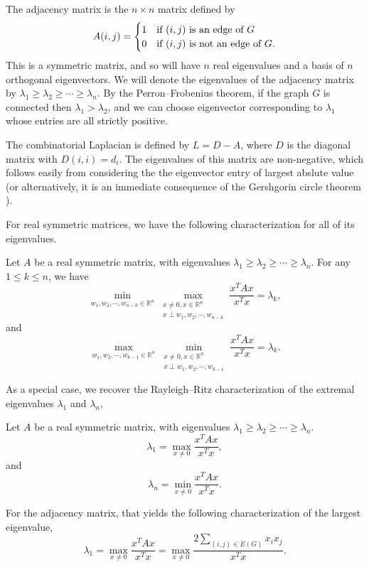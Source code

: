 The adjacency matrix is the $n \times n$ matrix defined by
\[
 A(i,j) =
  \begin{cases} 
      \hfill 1 \hfill & \text{if $(i,j)$ is an edge of $G$} \\
      \hfill 0 \hfill & \text{if $(i,j)$ is not an edge of $G$.} \\
  \end{cases}
\]
This is a symmetric matrix, and so will have $n$ real eigenvalues and a basis of
$n$ orthogonal eigenvectors.  We will denote the eigenvalues of the adjacency matrix
by $\lambda_1 \geq \lambda_2 \geq \cdots \geq \lambda_n$.  By the Perron--Frobenius theorem,
if the graph $G$ is connected then $\lambda_1 > \lambda_2$, and we can choose
eigenvector corresponding to $\lambda_1$ whose entries are all strictly positive.


The combinatorial Laplacian is defined by $L = D - A$, where $D$ is the diagonal matrix
with $D(i,i) = d_i$.  The eigenvalues of this matrix are non-negative, which follows
easily from considering the the eigenvector entry of largest abslute value (or alternatively,
it is an immediate consequence of the Gershgorin circle theorem \cite{HornJohnson2012}).  

For real symmetric matrices, we have the following characterization for all of its eigenvalues.
\begin{theorem}
  Let $A$ be a real symmetric matrix, with
   eigenvalues $\lambda_1 \geq \lambda_2 \geq \cdots \geq \lambda_n$.
  For any $1 \leq k \leq n$, we have
  \[ \min_{w_1, w_2, \cdots, w_{n-k} \in \mathbb{R}^n} \max_{\substack{x\neq 0, x \in \mathbb{R}^n\\x \perp w_1, w_2, \cdots, w_{n-k}}} \frac{x^T A x}{x^T x} = \lambda_k, \]
  and
  \[ \max_{w_1, w_2, \cdots, w_{k-1} \in \mathbb{R}^n} \min_{\substack{x\neq 0, x \in \mathbb{R}^n\\x \perp w_1, w_2, \cdots, w_{k-1}}} \frac{x^T A x}{x^T x} = \lambda_k .\]
  
\end{theorem}
\noindent As a special case, we recover the Rayleigh--Ritz characterization of the extremal eigenvalues
$\lambda_1$ and $\lambda_n$,
\begin{theorem}\label{rayleigh quotient}
  Let $A$ be a real symmetric matrix, with
   eigenvalues $\lambda_1 \geq \lambda_2 \geq \cdots \geq \lambda_n$.
  \[ \lambda_1 = \max_{x \neq 0} \frac{x^T A x}{x^T x},\]
  and
  \[ \lambda_n = \min_{x \neq 0} \frac{x^T A x}{x^T x}.\]  
\end{theorem}
\noindent For the adjacency matrix, that yields the following characterization of the largest
eigenvalue,
\[ \lambda_1 = \max_{x \neq 0} \frac{x^T A x}{x^T x} = \max_{x \neq 0} \frac{2\sum_{(i,j) \in E(G)} x_i x_j}{x^T x}.\]



